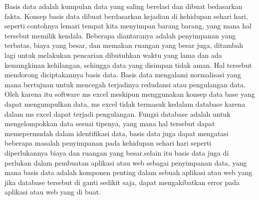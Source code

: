 \documentclass[a4paper,12 pt]{article}
\begin{document}
Basis data adalah kumpulan data yang saling berelasi dan dibuat bedasarkan fakta. Konsep basis data dibuat berdasarkan kejadian di kehidupan sehari hari, seperti contohnya lemari tempat kita menyimpan barang barang, yang mana hal tersebut memilik kendala. Beberapa diantaranya adalah penyimpanan yang terbatas, biaya yang besar, dan memakan ruangan yang besar juga, ditambah lagi untuk melakukan pencarian dibutuhkan waktu yang lama dan ada kemungkinan kehilangan, sehingga data yang disimpan tidak aman.
\newline
\newline
Hal tersebut mendorong diciptakannya basis data. Basis data mengalami normalisasi yang mana bertujuan untuk mencegah terjadinya redudansi atau pengulangan data. Oleh karena itu software ms excel meskipun menggunakan konsep data base yang dapat mengumpulkan data, ms excel tidak termasuk kedalam database karena dalam ms excel dapat terjadi pengulangan.  
\newline
\newline
Fungsi database adalah untuk mengelompokkan data sesuai tipenya, yang mana hal tersebut dapat memepermudah dalam identifikasi data, basis data juga dapat mengatasi beberapa masalah penyimpanan pada kehidupan sehari hari seperti diperlukannya biaya dan ruangan yang besar.selain itu basis data juga di perlukan dalam pembuatan aplikasi atau web sebagai penyimpanan data, yang  mana basis data adalah komponen penting dalam sebuah aplikasi atau web yang jika database tersebut di ganti sedikit saja, dapat mengakibatkan error pada aplikasi atau web yang di buat.
\end{document}
